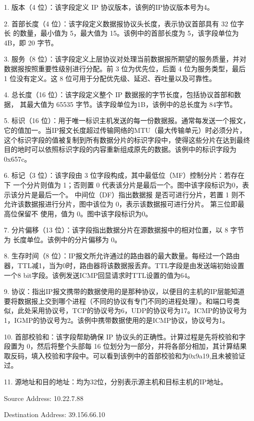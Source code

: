 \documentclass[a4paper,12pt]{report}
\begin{document}
\begin{spacing}{1.5}
1. 版本（4 位）：该字段定义 IP 协议版本，该例的IP协议版本号为4。

2. 首部长度（4 位）：该字段定义数据报协议头长度，表示协议首部具有 32 位字长 的数量，最小值为 5，最大值为 15。该例中的首部长度为 5，该字段单位为4B，即 20 字节。

3. 服务（8 位）：该字段定义上层协议对处理当前数据报所期望的服务质量，并对 数据报按照重要性级别进行分配。前 3 位为优先位，后面 4 位为服务类型，最后 1 位没有定义。这 8 位可用于分配优先级、延迟、吞吐量以及可靠性。

4. 总长度（16 位）：该字段定义整个 IP 数据报的字节长度，包括协议首部和数据， 其最大值为 65535 字节。该字段单位为1B，该例中的总长度为 84字节。

5. 标识（16 位）：用于唯一标识主机发送的每一份数据报。通常每发送一个报文，它的值加一。当IP报文长度超过传输网络的MTU（最大传输单元）时必须分片，这个标识字段的值被复制到所有数据分片的标识字段中，使得这些分片在达到最终目的地时可以依照标识字段的内容重新组成原先的数据。该例中的标识字段为0x657c。

6. 标记（3 位）：该字段由 3 位字段构成，其中最低位（MF）控制分片：若存在下 一个分片则值为 1；否则置 0 代表该分片是最后一个。图中该字段标识为0，表示该分片是最后一个。
中间位（DF）指出数据报 是否可进行分片，若置 1 则不允许该数据报进行分片，图中该位为 0，表示该数据报可进行分片。
第三位即最高位保留不 使用，值为 0。图中该字段标识为0。

7. 分片偏移（13 位）：该字段指出数据分片在源数据报中的相对位置，以 8 字节为 长度单位。该例中的分片偏移为 0。

8. 生存时间（8 位）：IP报文所允许通过的路由器的最大数量。每经过一个路由器，TTL减1，当为0时，路由器将该数据报丢弃。TTL字段是由发送端初始设置一个8 bit字段。该例发送ICMP回显请求时TTL设置的值为64。

9. 协议：指出IP报文携带的数据使用的是那种协议，以便目的主机的IP层能知道要将数据报上交到哪个进程（不同的协议有专门不同的进程处理）。和端口号类似，此处采用协议号，TCP的协议号为6，UDP的协议号为17。ICMP的协议号为1，IGMP的协议号为2。该例中携带数据使用的是ICMP协议，协议号为1。

10. 首部校验和：该字段帮助确保 IP 协议头的正确性。计算过程是先将校验和字段置为 0，然后将整个头部每 16 位划分为一部分，并将各部分相加，其计算结果取反码，填入校验和字段中。可以看到该例中的首部校验和为0x9a19,且未被验证过。

11. 源地址和目的地址：均为32位，分别表示源主机和目标主机的IP地址。

Source Address: 10.22.7.88

Destination Address: 39.156.66.10


\end{spacing}
\end{document}

